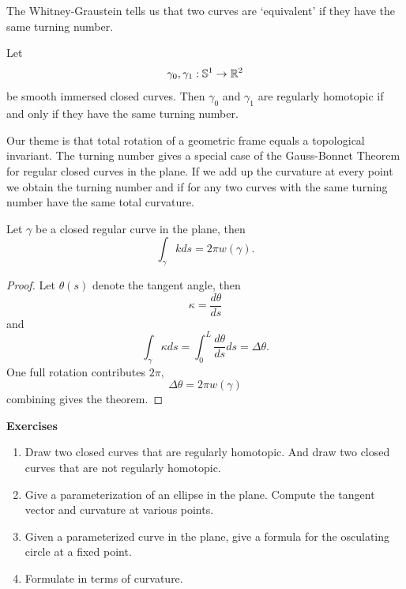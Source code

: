 The Whitney-Graustein tells us that two curves are `equivalent'
if they have the same turning number.
\begin{theorem}
Let
\[
\gamma_0,\gamma_1 : \mathbb{S}^1 \to \mathbb{R}^2
\]
be smooth immersed closed curves. Then \(\gamma_0\) and \(\gamma_1\) are
regularly homotopic if and only if they have the same turning number.
\end{theorem}


Our theme is that total rotation of a geometric frame equals a topological invariant.
The turning number gives a special case of the Gauss-Bonnet Theorem for regular closed
curves in the plane. If we add up the curvature at every point we obtain
the turning number and if for any two curves with the same turning number
have the same total curvature.

\begin{theorem}\label{thm:curves-bonnet}
Let $\gamma$ be a closed regular curve in the plane, then
$$\int_\gamma k ds=2\pi w(\gamma).$$
\end{theorem}
\begin{proof}
Let $\theta(s)$ denote the tangent angle,
then $$\kappa=\frac{d\theta}{ds}$$
and
$$\int_\gamma \kappa ds=\int_0^L\frac{d\theta}{ds}ds=\Delta \theta.$$
One full rotation contributes $2\pi,$
$$\Delta \theta=2\pi w(\gamma)$$
combining gives the theorem.
\end{proof}



\noindent \textbf{Exercises}

\begin{enumerate}

	\item Draw two closed curves that are regularly homotopic. And draw two closed curves that are not regularly homotopic.
	
	 \item Give a parameterization of an ellipse in the plane. Compute the tangent vector and curvature at various points.
 
 \item Given a parameterized curve in the plane, give a formula for the osculating circle at a fixed point.
 
 \item Formulate  in terms of curvature.

\end{enumerate}

\pagebreak